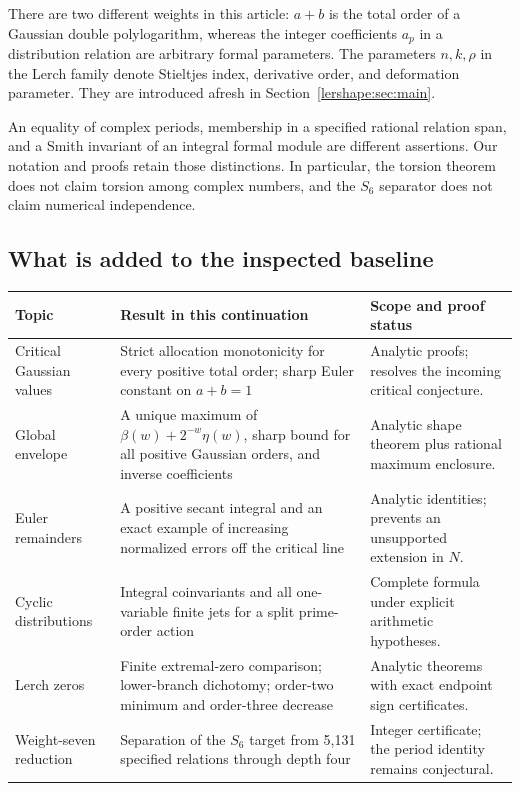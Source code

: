 There are two different weights in this article: $a+b$ is the total
order of a Gaussian double polylogarithm, whereas the integer coefficients
$a_p$ in a distribution relation are arbitrary formal parameters.
The parameters $n,k,\rho$ in the Lerch family denote Stieltjes index,
derivative order, and deformation parameter. They are introduced afresh
in Section~\ref{lershape:sec:main}.

An equality of complex periods, membership in a specified rational
relation span, and a Smith invariant of an integral formal module are
different assertions. Our notation and proofs retain those distinctions.
In particular, the torsion theorem does not claim torsion among complex
numbers, and the $S_6$ separator does not claim numerical independence.

\subsection{What is added to the inspected baseline}

\begin{table}[htbp]
\centering
\begin{tabular}{@{}L{0.21\textwidth}L{0.39\textwidth}L{0.33\textwidth}@{}}
\toprule
Topic & Result in this continuation & Scope and proof status\\
\midrule
Critical Gaussian values & Strict allocation monotonicity for every
positive total order; sharp Euler constant on $a+b=1$
& Analytic proofs; resolves the incoming critical conjecture.\\[5pt]
Global envelope & A unique maximum of $\beta(w)+2^{-w}\eta(w)$,
sharp bound for all positive Gaussian orders, and inverse coefficients
& Analytic shape theorem plus rational maximum enclosure.\\[5pt]
Euler remainders & A positive secant integral and an exact example of
increasing normalized errors off the critical line
& Analytic identities; prevents an unsupported extension in $N$.\\[5pt]
Cyclic distributions & Integral coinvariants and all one-variable
finite jets for a split prime-order action
& Complete formula under explicit arithmetic hypotheses.\\[5pt]
Lerch zeros & Finite extremal-zero comparison; lower-branch dichotomy;
order-two minimum and order-three decrease
& Analytic theorems with exact endpoint sign certificates.\\[5pt]
Weight-seven reduction & Separation of the $S_6$ target from 5,131
specified relations through depth four
& Integer certificate; the period identity remains conjectural.\\
\bottomrule
\end{tabular}
\end{table}

